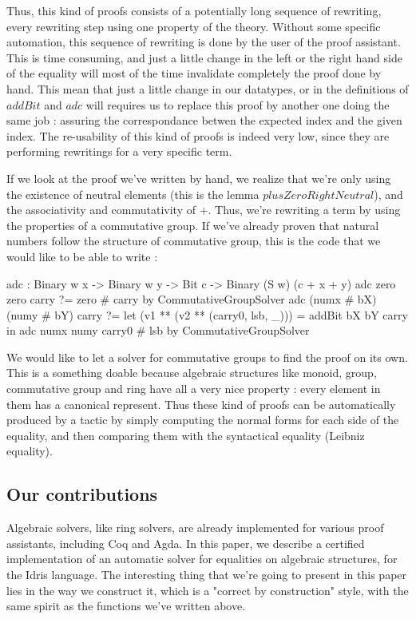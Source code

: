 Thus, this kind of proofs consists of a potentially long sequence of rewriting, every rewriting step using one property of the theory. Without some specific automation, this sequence of rewriting is done by the user of the proof assistant. This is time consuming, and just a little change in the left or the right hand side of the equality will most of the time invalidate completely the proof done by hand. This mean that just a little change in our datatypes, or in the definitions of $addBit$ and $adc$ will requires us to replace this proof by another one doing the same job : assuring the correspondance betwen the expected index and the given index. The re-usability of this kind of proofs is indeed very low, since they are performing rewritings for a very specific term.

If we look at the proof we've written by hand, we realize that we're only using the existence of neutral elements (this is the lemma $plusZeroRightNeutral$), and the associativity and commutativity of $+$. Thus, we're rewriting a term by using the properties of a commutative group.
If we've already proven that natural numbers follow the structure of commutative group, this is the code that we would like to be able to write :

\begin{code}[caption=Code we'd like to write for the addition of two binary numbers, captionpos=b, label=lst1:haskell2]
adc : Binary w x -> Binary w y -> Bit c 
     -> Binary (S w) (c + x + y)
adc zero zero carry ?= zero # carry 
        by CommutativeGroupSolver
adc (numx # bX) (numy # bY) carry
   ?= let (v1 ** (v2 ** (carry0, lsb, _))) = 
      addBit bX bY carry in
          adc numx numy carry0 # lsb 
        by CommutativeGroupSolver
\end{code}
We would like to let a solver for commutative groups to find the proof on its own.
This is a something doable because algebraic structures like monoid, group, commutative group and ring have all a very nice property : every element in them has a canonical represent. Thus these kind of proofs can be automatically produced by a tactic by simply computing the normal forms for each side of the equality, and then comparing them with the syntactical equality (Leibniz equality).

\subsection{Our contributions}

Algebraic solvers, like ring solvers, are already implemented for various proof assistants, including Coq and Agda. In this paper, we describe a certified implementation of an automatic solver for equalities on algebraic structures, for the Idris language. The interesting thing that we're going to present in this paper lies in the way we construct it, which is a "correct by construction" style, with the same spirit as the functions we've written above.

